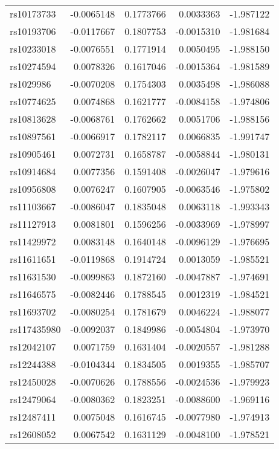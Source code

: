 \documentclass[
]{article}
\theoremstyle{plain}
\begin{document}
\begin{longtable}[t]{lrrrr}
\endfoot
\bottomrule
\endlastfoot
rs10173733 & -0.0065148 & 0.1773766 & 0.0033363 & -1.987122\\
rs10193706 & -0.0117667 & 0.1807753 & -0.0015310 & -1.981684\\
rs10233018 & -0.0076551 & 0.1771914 & 0.0050495 & -1.988150\\
rs10274594 & 0.0078326 & 0.1617046 & -0.0015364 & -1.981589\\
rs1029986 & -0.0070208 & 0.1754303 & 0.0035498 & -1.986088\\
\addlinespace
rs10774625 & 0.0074868 & 0.1621777 & -0.0084158 & -1.974806\\
rs10813628 & -0.0068761 & 0.1762662 & 0.0051706 & -1.988156\\
rs10897561 & -0.0066917 & 0.1782117 & 0.0066835 & -1.991747\\
rs10905461 & 0.0072731 & 0.1658787 & -0.0058844 & -1.980131\\
rs10914684 & 0.0077356 & 0.1591408 & -0.0026047 & -1.979616\\
\addlinespace
rs10956808 & 0.0076247 & 0.1607905 & -0.0063546 & -1.975802\\
rs11103667 & -0.0086047 & 0.1835048 & 0.0063118 & -1.993343\\
rs11127913 & 0.0081801 & 0.1596256 & -0.0033969 & -1.978997\\
rs11429972 & 0.0083148 & 0.1640148 & -0.0096129 & -1.976695\\
rs11611651 & -0.0119868 & 0.1914724 & 0.0013059 & -1.985521\\
\addlinespace
rs11631530 & -0.0099863 & 0.1872160 & -0.0047887 & -1.974691\\
rs11646575 & -0.0082446 & 0.1788545 & 0.0012319 & -1.984521\\
rs11693702 & -0.0080254 & 0.1781679 & 0.0046224 & -1.988077\\
rs117435980 & -0.0092037 & 0.1849986 & -0.0054804 & -1.973970\\
rs12042107 & 0.0071759 & 0.1631404 & -0.0020557 & -1.981288\\
\addlinespace
rs12244388 & -0.0104344 & 0.1834505 & 0.0019355 & -1.985707\\
rs12450028 & -0.0070626 & 0.1788556 & -0.0024536 & -1.979923\\
rs12479064 & -0.0080362 & 0.1823251 & -0.0088600 & -1.969116\\
rs12487411 & 0.0075048 & 0.1616745 & -0.0077980 & -1.974913\\
rs12608052 & 0.0067542 & 0.1631129 & -0.0048100 & -1.978521\\

\end{longtable}
\end{document}
